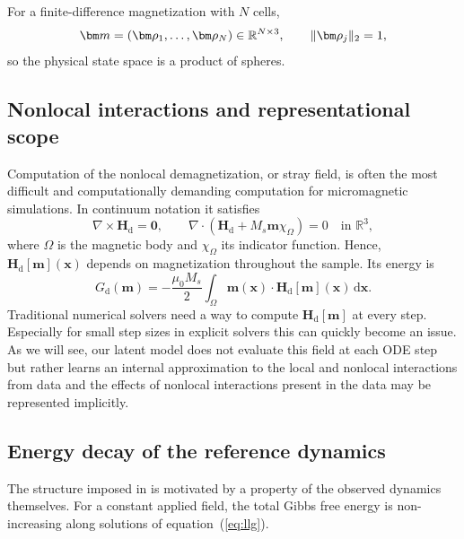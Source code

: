 \documentclass[a4paper,11pt]{article}
\newcommand{\R}{\mathbb{R}}
\newcommand{\m}{\bm m}
\DeclarePairedDelimiter{\norm}{\lVert}{\rVert}
\begin{document}
For a finite-difference magnetization with $N$ cells,
\begin{equation}
 \m=(\bm \rho_1,\ldots,\bm \rho_N)\in\R^{N\times3},\qquad \norm{\bm \rho_j}_2=1,
 \label{eq:mag-constraint}
\end{equation}
so the physical state space is a product of spheres.

\subsection{Nonlocal interactions and representational scope}
Computation of the nonlocal demagnetization, or stray field, is often the most difficult and computationally demanding computation for micromagnetic simulations.
In continuum notation it satisfies
\begin{equation}
 \nabla\times\bm H_{\mathrm d}=\bm0,\qquad
 \nabla\cdot(\bm H_{\mathrm d}+M_s\m\chi_\Omega)=0\quad\text{in }\R^3,
 \label{eq:magnetostatics}
\end{equation}
where $\Omega$ is the magnetic body and $\chi_\Omega$ its indicator function. Hence, $\bm H_{\mathrm d}[\m](\bm x)$ depends on magnetization throughout the sample. Its energy is
\begin{equation}
 G_{\mathrm d}(\m)=-\frac{\mu_0M_s}{2}\int_\Omega \m(\bm x)\cdot\bm H_{\mathrm d}[\m](\bm x)\,\mathrm d\bm x.
 \label{eq:demag-energy}
\end{equation}
Traditional numerical solvers need a way to compute $\bm H_{\mathrm d}[\m]$ at every step. Especially for small step sizes in explicit solvers this can quickly become an issue.
As we will see, our latent model does not evaluate this field at each ODE step but rather learns an internal approximation to the local and nonlocal interactions from data and the effects of nonlocal interactions present in the data may be represented implicitly.

\subsection{Energy decay of the reference dynamics}\label{sec:gibbs-decay}

The structure imposed in  is motivated by a
property of the observed dynamics themselves. For a constant applied field, the
total Gibbs free energy is non-increasing along solutions of equation~(\ref{eq:llg}).
\end{document}
